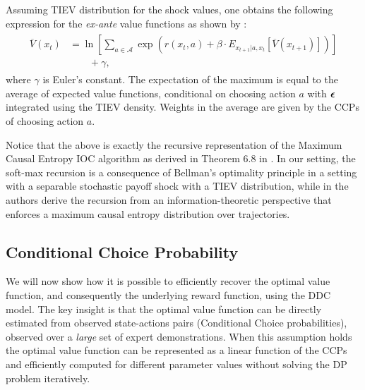 \documentclass{article}
\renewcommand{\vec}[1]{\mbox{\bm{$#1$}}}
\begin{document}
Assuming TIEV distribution for the shock values, one obtains the following expression for the \emph{ex-ante} value functions as shown by \cite{rust_gmc}:
\begin{align} \label{eq:exanterust}
\begin{split}
\overline{V}(x_t) &=\ln\left[\sum_{a\in\mathcal{A}} \exp\left(r(x_t,a)+\beta \cdot E_{x_{t+1}|a,x_t} \left[ \overline{V}(x_{t+1}) \right] \right)\right] \\
& \qquad +\gamma,
\end{split}
\end{align}
where $\gamma$ is Euler's constant. The expectation of the maximum is equal to the average of expected value functions, conditional on choosing action $a$ with $\vec{\epsilon}$ integrated using the TIEV density. Weights in the average are given by the CCPs of choosing action $a$.


Notice that the above is exactly the recursive representation of the Maximum Causal Entropy IOC algorithm as derived in Theorem 6.8 in \cite{ziebart_phd}. In our setting, the soft-max recursion is a consequence of Bellman's optimality principle in a setting with a separable stochastic payoff shock with a TIEV distribution, while in \cite{ziebart_phd} the authors derive the recursion from an information-theoretic perspective that enforces a maximum causal entropy distribution over trajectories.

\subsection{Conditional Choice Probability}

We will now show how it is possible to efficiently recover the optimal value function, and consequently the underlying reward function, using the DDC model. The key insight is that the optimal value function can be directly estimated from observed state-actions pairs (Conditional Choice probabilities), observed over a \textit{large} set of expert demonstrations. When this assumption holds the optimal value function can be represented as a linear function of the CCPs and efficiently computed for different parameter values without solving the DP problem iteratively.
\end{document}
